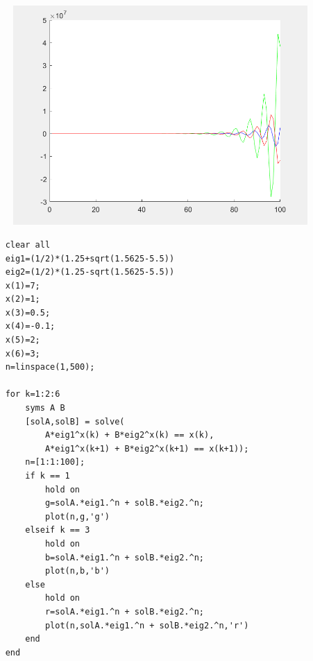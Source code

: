 \begin{homeworkProblem}[6]
\begin{enumerate}
\begin{multicols}{2}
    \begin{figure}[H]
        \centering
        \includegraphics[scale=0.35]{fig/fig6(f).png}
    \end{figure}
    \end{multicols}

    \begin{listing}[htbp]
        \begin{tcolorbox}
        \begin{verbatim}
    clear all
    eig1=(1/2)*(1.25+sqrt(1.5625-5.5))
    eig2=(1/2)*(1.25-sqrt(1.5625-5.5))
    x(1)=7;
    x(2)=1;
    x(3)=0.5;
    x(4)=-0.1;
    x(5)=2;
    x(6)=3;
    n=linspace(1,500);

    for k=1:2:6
        syms A B
        [solA,solB] = solve(
            A*eig1^x(k) + B*eig2^x(k) == x(k),
            A*eig1^x(k+1) + B*eig2^x(k+1) == x(k+1));
        n=[1:1:100];
        if k == 1
            hold on
            g=solA.*eig1.^n + solB.*eig2.^n;
            plot(n,g,'g')
        elseif k == 3
            hold on
            b=solA.*eig1.^n + solB.*eig2.^n;
            plot(n,b,'b')
        else
            hold on
            r=solA.*eig1.^n + solB.*eig2.^n;
            plot(n,solA.*eig1.^n + solB.*eig2.^n,'r')
        end
    end
        \end{verbatim}
        \end{tcolorbox}
    \end{listing}
    \end{enumerate}
    \end{homeworkProblem}